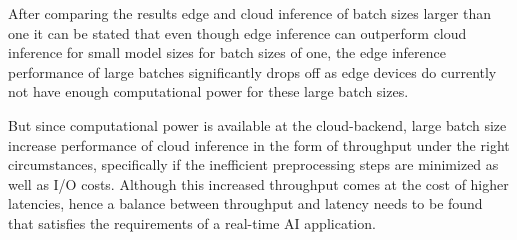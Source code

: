 \FloatBarrier

After comparing the results edge and cloud inference of batch sizes larger than one it can be stated that even though edge inference can outperform cloud inference for small model sizes for batch sizes of one, the edge inference performance of large batches significantly drops off as edge devices do currently not have enough computational power for these large batch sizes.

But since computational power is available at the cloud-backend, large batch size increase performance of cloud inference in the form of throughput under the right circumstances, specifically if the inefficient preprocessing steps are minimized as well as I/O costs.
Although this increased throughput comes at the cost of higher latencies, hence a balance between throughput and latency needs to be found that satisfies the requirements of a real-time AI application.

